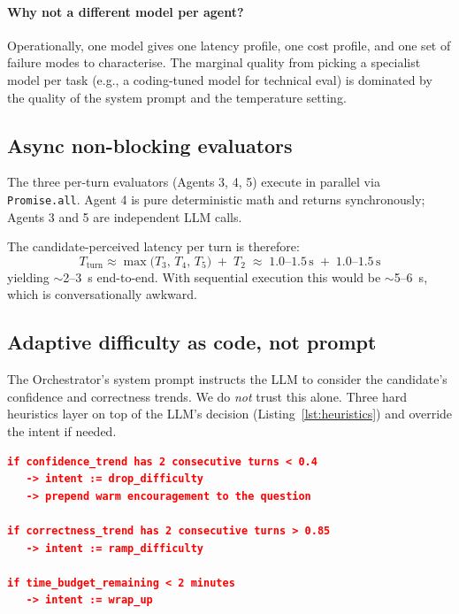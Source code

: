 \documentclass[11pt,a4paper]{article}
\begin{document}
\paragraph{Why not a different model per agent?} Operationally, one model
gives one latency profile, one cost profile, and one set of failure modes
to characterise. The marginal quality from picking a specialist model per
task (e.g., a coding-tuned model for technical eval) is dominated by the
quality of the system prompt and the temperature setting.

\subsection{Async non-blocking evaluators}

The three per-turn evaluators (Agents 3, 4, 5) execute in parallel via
\texttt{Promise.all}. Agent 4 is pure deterministic math and returns
synchronously; Agents 3 and 5 are independent LLM calls.

The candidate-perceived latency per turn is therefore:
\begin{equation}
T_{\text{turn}} \approx \max\!\bigl(T_3,\,T_4,\,T_5\bigr) \;+\; T_2
\;\approx\; 1.0\text{--}1.5\,\text{s} \;+\; 1.0\text{--}1.5\,\text{s}
\end{equation}
yielding $\sim$2--3~s end-to-end. With sequential execution this would
be $\sim$5--6~s, which is conversationally awkward.

\subsection{Adaptive difficulty as code, not prompt}

The Orchestrator's system prompt instructs the LLM to consider the
candidate's confidence and correctness trends. We do \emph{not} trust
this alone. Three hard heuristics layer on top of the LLM's decision
(Listing~\ref{lst:heuristics}) and override the intent if needed.

\begin{lstlisting}[language=json,caption={Adaptive difficulty heuristics
applied server-side after the LLM call.},label={lst:heuristics}]
if confidence_trend has 2 consecutive turns < 0.4
   -> intent := drop_difficulty
   -> prepend warm encouragement to the question

if correctness_trend has 2 consecutive turns > 0.85
   -> intent := ramp_difficulty

if time_budget_remaining < 2 minutes
   -> intent := wrap_up
\end{lstlisting}
\end{document}
